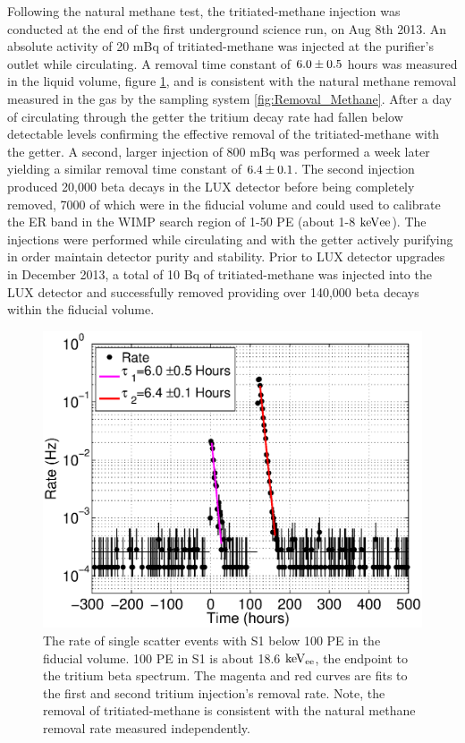 Following the natural methane test, the tritiated-methane injection was conducted at the end of the first underground science run, on Aug 8th 2013. An absolute activity of 20 mBq of tritiated-methane was injected at the purifier's outlet while circulating. A removal time constant of $\rm 6.0 \pm 0.5$ hours was measured in the liquid volume, figure \ref{fig:Removal}, and is consistent with the natural methane removal measured in the gas by the sampling system \ref{fig:Removal_Methane}. After a day of circulating through the getter the tritium decay rate had fallen below detectable levels confirming the effective removal of the tritiated-methane with the getter. A second, larger injection of 800 mBq was performed a week later yielding a similar removal time constant of $\rm 6.4 \pm 0.1$. The second injection produced 20,000 beta decays in the LUX detector before being completely removed, 7000 of which were in the fiducial volume and could used to calibrate the ER band in the WIMP search region of 1-50 PE (about 1-8 $\rm keV{ee}$). The injections were performed while circulating and with the getter actively purifying in order maintain detector purity and stability. Prior to LUX detector upgrades in December 2013, a total of 10 Bq of tritiated-methane was injected into the LUX detector and successfully removed providing over 140,000 beta decays within the fiducial volume. 

\renewcommand{\baselinestretch}{1}
\small\normalsize
\begin{figure}[h!]\centering
\includegraphics[width=120mm]{Chapter_T/Figures/CH3T_Rate_fid_150_Run03_Tritium_Rate.eps}
\caption{ The rate of single scatter events with S1 below 100 PE in the fiducial volume. 100 PE in S1 is about 18.6 $\rm keV_{ee}$, the endpoint to the tritium beta spectrum. The magenta and red curves are fits to the first and second tritium injection's removal rate. Note, the removal of tritiated-methane is consistent with the natural methane removal rate measured independently.}
\label{fig:Removal}
\end{figure}
\renewcommand{\baselinestretch}{2}
\small\normalsize



